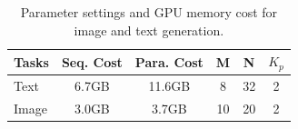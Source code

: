 \documentclass{article}
\begin{document}
\begin{table}[htbp]
\centering
\captionsetup{skip=8pt}
\caption{Parameter settings and GPU memory cost for image and text generation.}
\label{tab:memory}
\begin{tabular}{lccccc}
\toprule
Tasks & \textbf{Seq. Cost} &\textbf{Para. Cost} & \textbf{M}  & \textbf{N}  & \textbf{$K_p$} \\ \midrule
Text  & 6.7GB             & 11.6GB            & 8  & 32 & 2    \\ \midrule
Image & 3.0GB             & 3.7GB             & 10 & 20 & 2    \\ 
\bottomrule
\end{tabular}
\end{table}



\clearpage

%
\end{document}
